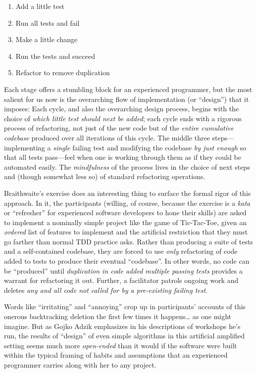 \begin{enumerate}
\item Add a little test
\item Run all tests and fail
\item Make a little change
\item Run the tests and succeed
\item Refactor to remove duplication
\end{enumerate}

Each stage offers a stumbling block for an experienced programmer, but the most salient for us now is the overarching flow of implementation (or ``design'') that it imposes: Each cycle, and also the overarching design process, begins with the choice of \emph{which little test should next be added}; each cycle ends with a rigorous process of refactoring, not just of the new code but of the \emph{entire cumulative codebase} produced over all iterations of this cycle. The middle three steps---implementing a \emph{single} failing test and modifying the codebase \emph{by just enough} so that all tests pass---feel when one is working through them as if they could be automated easily. The \emph{mindfulness} of the process lives in the choice of next steps and (though somewhat less so) of standard refactoring operations.

Braithwaite's exercise does an interesting thing to surface the formal rigor of this approach. In it, the participants (willing, of course, because the exercise is a \emph{kata} or ``refresher'' for experienced software developers to hone their skills) are asked to implement a nominally simple project like the game of Tic-Tac-Toe, given an \emph{ordered} list of features to implement and the artificial restriction that they must go farther than normal TDD practice asks. Rather than producing a suite of tests and a self-contained codebase, they are forced to use \emph{only} refactoring of code added to tests to produce their eventual ``codebase''. In other words, no code can be ``produced'' until \emph{duplication in code added multiple passing tests} provides a warrant for refactoring it out. Further, a facilitator patrols ongoing work and deletes \emph{any and all code not called for by a pre-existing failing test}.

Words like ``irritating'' and ``annoying'' crop up in participants' accounts of  this onerous backtracking deletion the first few times it happens\ldots{} as one might imagine. But as Gojko Adzik emphasizes in his descriptions of workshops he's run, the results of ``design'' of even simple algorithms in this artificial amplified setting seems much more \emph{open-ended} than it would if the software were built within the typical framing of habits and assumptions that an experienced programmer carries along with her to any project.

